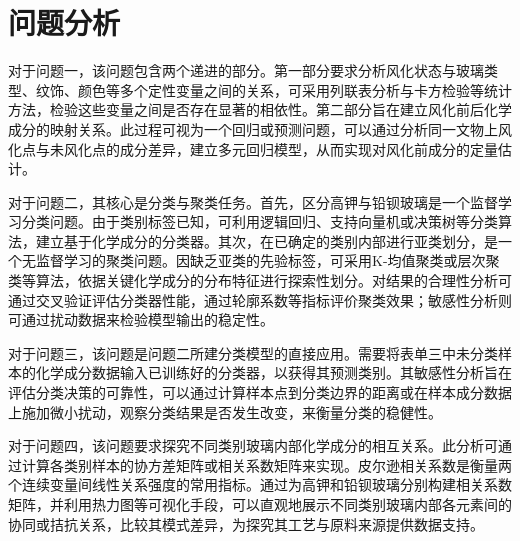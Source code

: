 \section{问题分析}

对于问题一，该问题包含两个递进的部分。第一部分要求分析风化状态与玻璃类型、纹饰、颜色等多个定性变量之间的关系，可采用列联表分析与卡方检验等统计方法，检验这些变量之间是否存在显著的相依性。第二部分旨在建立风化前后化学成分的映射关系。此过程可视为一个回归或预测问题，可以通过分析同一文物上风化点与未风化点的成分差异，建立多元回归模型，从而实现对风化前成分的定量估计。

对于问题二，其核心是分类与聚类任务。首先，区分高钾与铅钡玻璃是一个监督学习分类问题。由于类别标签已知，可利用逻辑回归、支持向量机或决策树等分类算法，建立基于化学成分的分类器。其次，在已确定的类别内部进行亚类划分，是一个无监督学习的聚类问题。因缺乏亚类的先验标签，可采用K-均值聚类或层次聚类等算法，依据关键化学成分的分布特征进行探索性划分。对结果的合理性分析可通过交叉验证评估分类器性能，通过轮廓系数等指标评价聚类效果；敏感性分析则可通过扰动数据来检验模型输出的稳定性。

对于问题三，该问题是问题二所建分类模型的直接应用。需要将表单三中未分类样本的化学成分数据输入已训练好的分类器，以获得其预测类别。其敏感性分析旨在评估分类决策的可靠性，可以通过计算样本点到分类边界的距离或在样本成分数据上施加微小扰动，观察分类结果是否发生改变，来衡量分类的稳健性。

对于问题四，该问题要求探究不同类别玻璃内部化学成分的相互关系。此分析可通过计算各类别样本的协方差矩阵或相关系数矩阵来实现。皮尔逊相关系数是衡量两个连续变量间线性关系强度的常用指标。通过为高钾和铅钡玻璃分别构建相关系数矩阵，并利用热力图等可视化手段，可以直观地展示不同类别玻璃内部各元素间的协同或拮抗关系，比较其模式差异，为探究其工艺与原料来源提供数据支持。

